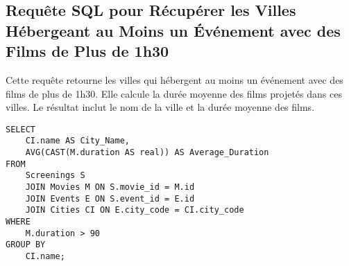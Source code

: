 \subsection{Requête SQL pour Récupérer les Villes Hébergeant au Moins un Événement avec des Films de Plus de 1h30}

Cette requête retourne les villes qui hébergent au moins un événement avec des films de plus de 1h30. Elle calcule la durée moyenne des films projetés dans ces villes. Le résultat inclut le nom de la ville et la durée moyenne des films.

\begin{lstlisting}
SELECT
    CI.name AS City_Name,
    AVG(CAST(M.duration AS real)) AS Average_Duration
FROM
    Screenings S
    JOIN Movies M ON S.movie_id = M.id
    JOIN Events E ON S.event_id = E.id
    JOIN Cities CI ON E.city_code = CI.city_code
WHERE
    M.duration > 90
GROUP BY
    CI.name;
\end{lstlisting}